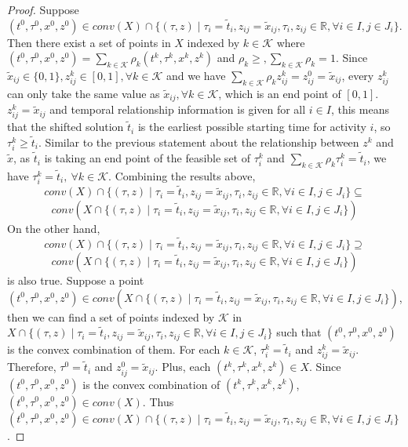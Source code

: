 \documentclass[11pt]{article}
\begin{document}
	\begin{proof}
		Suppose \((t^0, \tau^0, x^0, z^0) \in  conv(X) \cap \{(\tau,z) \mid \tau_i = \tilde{t}_i, z_{ij} = \tilde{x}_{ij}, \tau_i, z_{ij} \in \mathbb{R}, \forall i \in I, j \in J_i \} \). Then there exist a set of points in \(X\) indexed by \(k \in \mathcal{K}\) where \((t^0, \tau^0, x^0, z^0) = \sum_{k \in \mathcal{K}}\rho_{k} (t^k, \tau^k, x^k, z^k) \) and \(\rho_{k} \geq, \sum_{k \in \mathcal{K}} \rho_{k} = 1\). Since \(\tilde{x}_{ij} \in \{0,1\}, z_{ij}^k \in [0,1], \forall k \in \mathcal{K}\) and we have \(\sum_{k \in \mathcal{K}} \rho_{k} z^k_{ij} = z^0_{ij} = \tilde{x}_{ij}\), every \(z^k_{ij}\) can only take the same value as \(\tilde{x}_{ij} , \forall k \in \mathcal{K}\), which is an end point of \([0,1]\).\\
		\newline
		\(z^k_{ij} = \tilde{x}_{ij}\) and temporal relationship information is given for all \(i \in I\), this means that the shifted solution \(\tilde{t}_i\) is the earliest possible starting time for activity \(i\), so \(\tau_i^k \geq \tilde{t}_i\). Similar to the previous statement about the relationship between \(z^k\) and \(\tilde{x}\), as \(\tilde{t}_i\) is taking an end point of the feasible set of \(\tau_i^k\) and \(\sum_{k \in \mathcal{K}} \rho_{k} \tau_i^k = \tilde{t}_i \), we have \(\tau_i^k = \tilde{t}_i,\ \forall k \in \mathcal{K}\). Combining the results above, 
		\[conv(X) \cap \{(\tau,z) \mid \tau_i = \tilde{t}_i, z_{ij} = \tilde{x}_{ij}, \tau_i, z_{ij} \in \mathbb{R}, \forall i \in I, j \in J_i \}  \subseteq \]
		\[conv(X \cap \{(\tau,z) \mid \tau_i = \tilde{t}_i, z_{ij} = \tilde{x}_{ij}, \tau_i, z_{ij} \in \mathbb{R}, \forall i \in I, j \in J_i \} )\]
		On the other hand, 
		\[conv(X) \cap \{(\tau,z) \mid \tau_i = \tilde{t}_i, z_{ij} = \tilde{x}_{ij}, \tau_i, z_{ij} \in \mathbb{R}, \forall i \in I, j \in J_i \}  \supseteq \]
		\[conv(X \cap \{(\tau,z) \mid \tau_i = \tilde{t}_i, z_{ij} = \tilde{x}_{ij}, \tau_i, z_{ij} \in \mathbb{R}, \forall i \in I, j \in J_i \} )\]
		is also true. Suppose a point \((t^0, \tau^0, x^0, z^0) \in conv(X \cap \{(\tau,z) \mid \tau_i = \tilde{t}_i, z_{ij} = \tilde{x}_{ij}, \tau_i, z_{ij} \in \mathbb{R}, \forall i \in I, j \in J_i \} )\), then we can find a set of points indexed by \(\mathcal{K}\) in \(X \cap \{(\tau,z) \mid \tau_i = \tilde{t}_i, z_{ij} = \tilde{x}_{ij}, \tau_i, z_{ij} \in \mathbb{R}, \forall i \in I, j \in J_i \} \) such that \((t^0, \tau^0, x^0, z^0) \) is the convex combination of them. For each \(k \in \mathcal{K}\), \(\tau_i^k = \tilde{t}_i\) and \(z_{ij}^k = \tilde{x}_{ij}\). Therefore, \(\tau^0 = \tilde{t}_i\) and \(z_{ij}^0 = \tilde{x}_{ij}\). Plus, each \((t^k, \tau^k, x^k, z^k) \in X \). Since \((t^0, \tau^0, x^0, z^0)\) is the convex combination of \((t^k, \tau^k, x^k, z^k)\), \((t^0, \tau^0, x^0, z^0) \in conv(X)\). Thus \((t^0, \tau^0, x^0, z^0) \in conv(X) \cap \{(\tau,z) \mid \tau_i = \tilde{t}_i, z_{ij} = \tilde{x}_{ij}, \tau_i, z_{ij} \in \mathbb{R}, \forall i \in I, j \in J_i \}  \).
	\end{proof}
\end{document}

